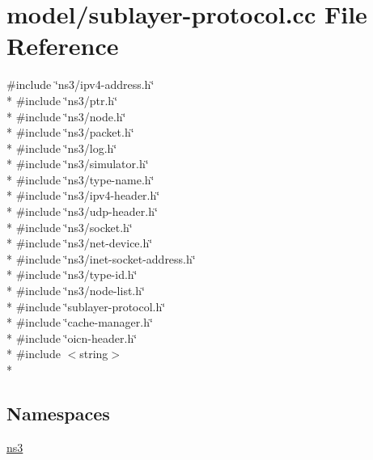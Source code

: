 \hypertarget{sublayer-protocol_8cc}{\section{model/sublayer-\/protocol.cc File Reference}
\label{sublayer-protocol_8cc}
}
{\ttfamily \#include \char`\"{}ns3/ipv4-\/address.\-h\char`\"{}}\\*
{\ttfamily \#include \char`\"{}ns3/ptr.\-h\char`\"{}}\\*
{\ttfamily \#include \char`\"{}ns3/node.\-h\char`\"{}}\\*
{\ttfamily \#include \char`\"{}ns3/packet.\-h\char`\"{}}\\*
{\ttfamily \#include \char`\"{}ns3/log.\-h\char`\"{}}\\*
{\ttfamily \#include \char`\"{}ns3/simulator.\-h\char`\"{}}\\*
{\ttfamily \#include \char`\"{}ns3/type-\/name.\-h\char`\"{}}\\*
{\ttfamily \#include \char`\"{}ns3/ipv4-\/header.\-h\char`\"{}}\\*
{\ttfamily \#include \char`\"{}ns3/udp-\/header.\-h\char`\"{}}\\*
{\ttfamily \#include \char`\"{}ns3/socket.\-h\char`\"{}}\\*
{\ttfamily \#include \char`\"{}ns3/net-\/device.\-h\char`\"{}}\\*
{\ttfamily \#include \char`\"{}ns3/inet-\/socket-\/address.\-h\char`\"{}}\\*
{\ttfamily \#include \char`\"{}ns3/type-\/id.\-h\char`\"{}}\\*
{\ttfamily \#include \char`\"{}ns3/node-\/list.\-h\char`\"{}}\\*
{\ttfamily \#include \char`\"{}sublayer-\/protocol.\-h\char`\"{}}\\*
{\ttfamily \#include \char`\"{}cache-\/manager.\-h\char`\"{}}\\*
{\ttfamily \#include \char`\"{}oicn-\/header.\-h\char`\"{}}\\*
{\ttfamily \#include $<$string$>$}\\*
\subsection*{Namespaces}
\begin{DoxyCompactItemize}
\item 
\hyperlink{namespacens3}{ns3}
\end{DoxyCompactItemize}
